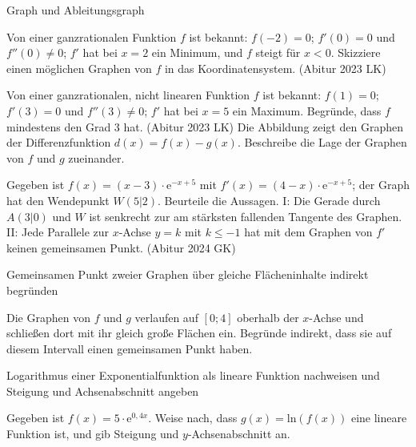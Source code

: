 \begin{aufgabe}{Graph und Ableitungsgraph}
\begin{teile}
\begin{ksys}[xmin=-1,xmax=5,ymin=-4,ymax=7]  \end{ksys}
\teil Von einer ganzrationalen Funktion $f$ ist bekannt: $f(-2) = 0$; $f'(0) = 0$ und $f''(0) \ne 0$; $f'$ hat bei $x = 2$ ein Minimum, und $f$ steigt für $x < 0$. Skizziere einen möglichen Graphen von $f$ in das Koordinatensystem. \hfill (Abitur 2023 LK)

\begin{ksys}[xmin=-3,xmax=6,ymin=-2,ymax=4]  \end{ksys}
\teil Von einer ganzrationalen, nicht linearen Funktion $f$ ist bekannt: $f(1) = 0$; $f'(3) = 0$ und $f''(3) \ne 0$; $f'$ hat bei $x = 5$ ein Maximum. Begründe, dass $f$ mindestens den Grad $3$ hat. \hfill (Abitur 2023 LK)
\teil Die Abbildung zeigt den Graphen der Differenzfunktion $d(x) = f(x) - g(x)$. Beschreibe die Lage der Graphen von $f$ und $g$ zueinander.

\begin{ksys}[xmin=-2,xmax=4,ymin=-3,ymax=3,ablesen]  \end{ksys}
\teil Gegeben ist $f(x) = (x - 3) \cdot \mathrm{e}^{-x + 5}$ mit $f'(x) = (4 - x) \cdot \mathrm{e}^{-x + 5}$; der Graph hat den Wendepunkt $W(5 | 2)$. Beurteile die Aussagen. I: Die Gerade durch $A(3 | 0)$ und $W$ ist senkrecht zur am stärksten fallenden Tangente des Graphen. II: Jede Parallele zur $x$-Achse $y = k$ mit $k \le -1$ hat mit dem Graphen von $f'$ keinen gemeinsamen Punkt. \hfill (Abitur 2024 GK)
\end{teile}
\end{aufgabe}

\begin{aufgabe}{Gemeinsamen Punkt zweier Graphen über gleiche Flächeninhalte indirekt begründen}
\begin{teile}
\teil Die Graphen von $f$ und $g$ verlaufen auf $[0; 4]$ oberhalb der $x$-Achse und schließen dort mit ihr gleich große Flächen ein. Begründe indirekt, dass sie auf diesem Intervall einen gemeinsamen Punkt haben.
\end{teile}
\end{aufgabe}

\begin{aufgabe}{Logarithmus einer Exponentialfunktion als lineare Funktion nachweisen und Steigung und Achsenabschnitt angeben}
\begin{teile}
\teil Gegeben ist $f(x) = 5 \cdot \mathrm{e}^{0{,}4x}$. Weise nach, dass $g(x) = \mathrm{ln}(f(x))$ eine lineare Funktion ist, und gib Steigung und $y$-Achsenabschnitt an.
\end{teile}
\end{aufgabe}

